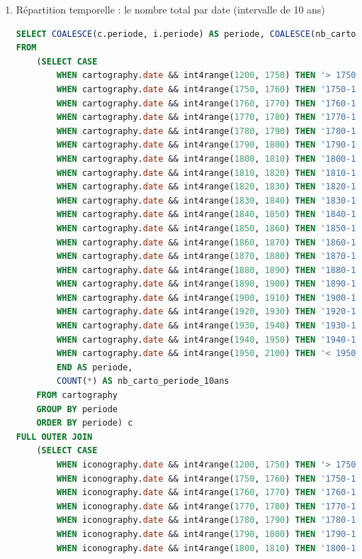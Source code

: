 \begin{enumerate}
\begin{enumerate}
        \item Répartition temporelle : le nombre total par date (intervalle de 10 ans)
            \begin{lstlisting}[language=SQL, caption=Nombre de sources par date (10 ans)]
SELECT COALESCE(c.periode, i.periode) AS periode, COALESCE(nb_carto_periode_10ans, 0) AS nb_carto_periode_10ans, COALESCE(nb_icono_periode_10ans, 0) AS nb_icono_periode_10ans
FROM 
    (SELECT CASE 
        WHEN cartography.date && int4range(1200, 1750) THEN '> 1750' 
        WHEN cartography.date && int4range(1750, 1760) THEN '1750-1760' 
        WHEN cartography.date && int4range(1760, 1770) THEN '1760-1770' 
        WHEN cartography.date && int4range(1770, 1780) THEN '1770-1780' 
        WHEN cartography.date && int4range(1780, 1790) THEN '1780-1790' 
        WHEN cartography.date && int4range(1790, 1800) THEN '1790-1800' 
        WHEN cartography.date && int4range(1800, 1810) THEN '1800-1810' 
        WHEN cartography.date && int4range(1810, 1820) THEN '1810-1820' 
        WHEN cartography.date && int4range(1820, 1830) THEN '1820-1830' 
        WHEN cartography.date && int4range(1830, 1840) THEN '1830-1840' 
        WHEN cartography.date && int4range(1840, 1850) THEN '1840-1850' 
        WHEN cartography.date && int4range(1850, 1860) THEN '1850-1860' 
        WHEN cartography.date && int4range(1860, 1870) THEN '1860-1870' 
        WHEN cartography.date && int4range(1870, 1880) THEN '1870-1880' 
        WHEN cartography.date && int4range(1880, 1890) THEN '1880-1890' 
        WHEN cartography.date && int4range(1890, 1900) THEN '1890-1900' 
        WHEN cartography.date && int4range(1900, 1910) THEN '1900-1910' 
        WHEN cartography.date && int4range(1920, 1930) THEN '1920-1930' 
        WHEN cartography.date && int4range(1930, 1940) THEN '1930-1940' 
        WHEN cartography.date && int4range(1940, 1950) THEN '1940-1950' 
        WHEN cartography.date && int4range(1950, 2100) THEN '< 1950' 
        END AS periode, 
        COUNT(*) AS nb_carto_periode_10ans
    FROM cartography 
    GROUP BY periode 
    ORDER BY periode) c
FULL OUTER JOIN 
    (SELECT CASE 
        WHEN iconography.date && int4range(1200, 1750) THEN '> 1750' 
        WHEN iconography.date && int4range(1750, 1760) THEN '1750-1760' 
        WHEN iconography.date && int4range(1760, 1770) THEN '1760-1770' 
        WHEN iconography.date && int4range(1770, 1780) THEN '1770-1780' 
        WHEN iconography.date && int4range(1780, 1790) THEN '1780-1790' 
        WHEN iconography.date && int4range(1790, 1800) THEN '1790-1800' 
        WHEN iconography.date && int4range(1800, 1810) THEN '1800-1810' 

\end{lstlisting}
\end{enumerate}
\end{enumerate}
